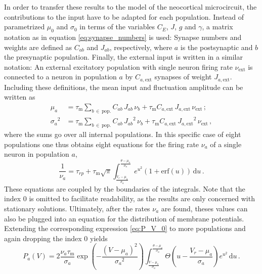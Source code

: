 In order to transfer these results to the model of the neocortical microcircuit, 
the contributions to the input have to be adapted for each population. Instead of 
parametrized $\mu_0$ and $\sigma_0$ in terms of the variables $C_E$, $J$, $g$ and $\gamma$, 
a matrix notation as in equation \eqref{eq:synapse_numbers} is used: 
Synapse numbers and weights are defined as $C_{ab}$ and $J_{ab}$, respectively, 
where $a$ is the postsynaptic and $b$ the presynaptic population. 
Finally, the external input is written in a similar notation: 
An external excitatory population with single neuron firing rate $\nu_\text{ext}$ 
is connected to a neuron in population $a$ by 
$C_{a, \text{ext}}$ synapses of weight $J_{a, \text{ext}}$.
Including these definitions, the mean input and fluctuation amplitude can 
be written as 
\begin{align}
    \mu_a        &= 
        \tau_\text{m} \sum_{b \,\in \,\text{pop.}} C_{ab} \, J_{ab} \, \nu_b 
        + \tau_\text{m} C_{a, \text{ext}} \, J_{a, \text{ext}} \, \nu_\text{ext} \, ; \\
    {\sigma_a}^2 &= 
        \tau_\text{m} \sum_{b \,\in \,\text{pop.}} C_{ab} \, {J_{ab}}^2  \, \nu_b
        + \tau_\text{m} C_{a, \text{ext}} \,{J_{a, \text{ext}}}^2 \,\nu_\text{ext}\,,
\end{align}
where the sums go over all internal populations. In this specific case of eight 
populations one thus obtains eight equations for the 
firing rate $\nu_a$ of a single neuron in population $a$, 
\begin{equation}
    \frac{1}{\nu_{a}} = \tau_{rp} 
        + \tau_\text{m} \sqrt{\pi}
            \int_{\frac{V_r - \mu_{a}}{\sigma_{a}}}^{\frac{\theta - \mu_{a}}{\sigma_{a}}} 
                e^{u^2} \left(1 + \text{erf}(u)\right) \,\text{d}u  \,.
    \label{eq:self_consistency_a}
\end{equation}
These equations are coupled by the boundaries of the integrals. Note that the index $0$ 
is omitted to facilitate readability, as the results are only concerned with stationary
solutions. Ultimately, after the rates $\nu_a$ are found, theses values can also be 
plugged into an equation for the distribution of membrane potentials. Extending the 
corresponding expression \eqref{eq:P_V_0} to more populations and again dropping the 
index $0$ yields
\begin{equation}
    P_a(V) = 2 \frac{\nu_a \tau_\text{m}}{\sigma_a} 
        \exp{\left(- \frac{(V - \mu_a)^2}{{\sigma_a}^2} \right)}
        \int_{\frac{V - \mu_a}{\sigma_a}}^{\frac{\theta - \mu_a}{\sigma_a}} \! 
            \Theta \left(u - \frac{V_r - \mu_a}{\sigma_a} \right) e^{u^2} \, \text{d}u  \,.
    \label{eq:P_V_a}
\end{equation}
